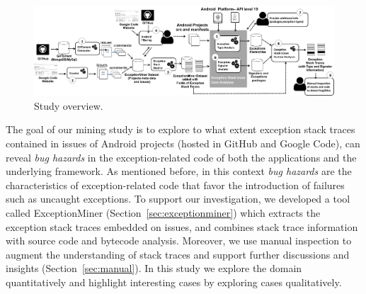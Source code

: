\begin{figure} 
\centering \includegraphics[width=.9\hsize]{overview_review.png}
\caption{Study overview.}\label{fig:overview} 
\end{figure}


The goal of our mining study is to explore to what extent exception stack traces 
contained in issues of Android projects (hosted in GitHub and Google Code), can reveal 
\emph{bug hazards} in the exception-related code of both the applications and the underlying framework. 
As mentioned before, in this context \emph{bug hazards} are the characteristics of exception-related code 
that favor the introduction of failures such as uncaught exceptions. 
To support our investigation, we developed a tool called ExceptionMiner (Section~\ref{sec:exceptionminer})
which extracts the exception stack traces embedded on issues, 
and combines stack trace information with source code and bytecode 
analysis. Moreover, we use manual inspection to augment
 the understanding of stack traces and support further discussions and insights (Section~\ref{sec:manual}).
In this study we explore the domain quantitatively and highlight interesting cases by 
exploring cases qualitatively. 


